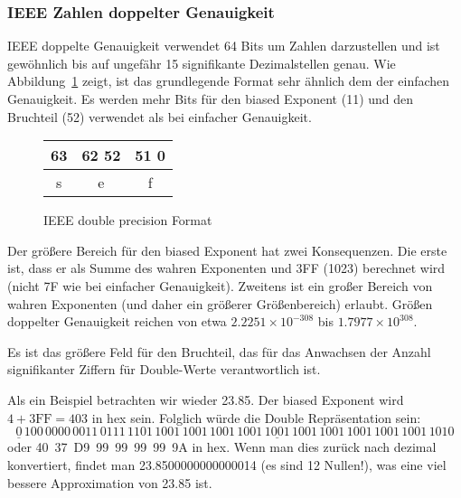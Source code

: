 \subsubsection{IEEE Zahlen doppelter Genauigkeit} 

IEEE doppelte Genauigkeit verwendet 64 Bits um Zahlen darzustellen
und ist gew\"{o}hnlich bis auf ungef\"{a}hr 15 signifikante Dezimalstellen
genau. Wie Abbildung~\ref{fig:IEEEdouble} zeigt, ist das
grundlegende Format sehr \"{a}hnlich dem der einfachen Genauigkeit. Es
werden mehr Bits f\"{u}r den biased Exponent (11) und den Bruchteil (52)
verwendet als bei einfacher Genauigkeit.

\begin{figure}[ht]
\centering
\begin{tabular}{|c|c|c|}
 \multicolumn{1}{p{0.3cm}}{63} &
 \multicolumn{1}{p{3cm}}{62 \hfill 52} &
 \multicolumn{1}{p{7cm}}{51 \hfill 0} \\
 \hline
 s & e & f \\
 \hline
\end{tabular}
\caption{IEEE double precision Format \label{fig:IEEEdouble}}
\end{figure}

Der gr\"{o}{\ss}ere Bereich f\"{u}r den biased Exponent hat zwei Konsequenzen.
Die erste ist, dass er als Summe des wahren Exponenten und 3FF
(1023) berechnet wird (nicht 7F wie bei einfacher Genauigkeit).
Zweitens ist ein gro{\ss}er Bereich von wahren Exponenten (und daher ein
gr\"{o}{\ss}erer Gr\"{o}{\ss}enbereich) erlaubt. Gr\"{o}{\ss}en doppelter Genauigkeit
reichen von etwa $2.2251 \times 10^{-308}$ bis $1.7977 \times
10^{308}$.

Es ist das gr\"{o}{\ss}ere Feld f\"{u}r den Bruchteil, das f\"{u}r das Anwachsen der
Anzahl signifikanter Ziffern f\"{u}r Double-Werte verantwortlich ist.

Als ein Beispiel betrachten wir wieder 23.85. Der biased Exponent
wird $4 + \mathrm{3FF} = 403$ in hex sein. Folglich w\"{u}rde die Double
Repr\"{a}sentation sein:
\[ \underline{0}\,100\,0000\,0011\,\underline{0111\,1101\,1001\,1001\,1001\,
   1001\,1001\,1001\,1001\,1001\,1001\,1001\,1010} \]
oder 40~37~D9~99~99~99~99~9A in hex. Wenn man dies zur\"{u}ck nach
dezimal konvertiert, findet man 23.8500000000000014 (es sind 12
Nullen!), was eine viel bessere Approximation von 23.85 ist.

